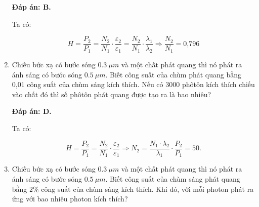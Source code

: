 \begin{enumerate}[label=\bfseries Câu \arabic*:]
{		
	}
	
	\loigiai
	{		\textbf{Đáp án: B.}
		
		Ta có:
		
		$$H = \dfrac{P_2}{P_1} = \dfrac{N_2}{N_1} \cdot \dfrac{\varepsilon_2}{\varepsilon_1} = \dfrac{N_2}{N_1} \cdot \dfrac{\lambda_1}{\lambda_2} \Rightarrow \dfrac{N_2}{N_1} = \text{0,796}$$
	
	}
		\item {}
		\cauhoi
	{Chiếu bức xạ có bước sóng $\SI{0,3}{\mu m}$ và một chất phát quang thì nó phát ra ánh sáng có bước sóng $\SI{0,5}{\mu m}$. Biết công suất của chùm phát quang bằng 0,01 công suất của chùm sáng kích thích. Nếu có 3000 phôtôn kích thích chiếu vào chất đó thì số phôtôn phát quang được tạo ra là bao nhiêu?
		
	}
	
	\loigiai
	{		\textbf{Đáp án: D.}
		
		Ta có:
		
		$$H = \dfrac{P_2}{P_1} = \dfrac{N_2}{N_1} \cdot \dfrac{\varepsilon_2}{\varepsilon_1} \Rightarrow N_2 = \dfrac{N_1 \cdot \lambda_2}{\lambda_1} \cdot \dfrac{P_2}{P_1} =50.$$
	}
		\item {}
		\cauhoi
	{Chiếu bức xạ có bước sóng $\SI{0,3}{\mu m}$ và một chất phát quang thì nó phát ra ánh sáng có bước sóng $\SI{0,5}{\mu m}$. Biết công suất của chùm sáng phát quang bằng $2\%$ công suất của chùm sáng kích thích. Khi đó, với mỗi photon phát ra ứng với bao nhiêu photon kích thích?
		
	}
	

\end{enumerate}
